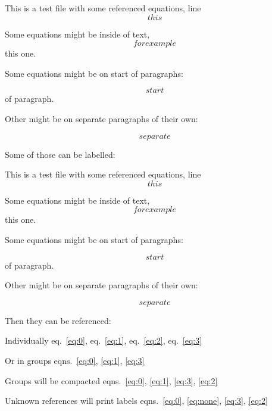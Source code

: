 This is a test file with some referenced equations, line \[ this \]

Some equations might be inside of text, \[ for example \] this one.

Some equations might be on start of paragraphs:

\[ start \] of paragraph.

Other might be on separate paragraphs of their own:

\[ separate \]

Some of those can be labelled:

This is a test file with some referenced equations, line
\begin{equation} this \label{eq:0}\end{equation}

Some equations might be inside of text,
\begin{equation} for example \label{eq:1}\end{equation} this one.

Some equations might be on start of paragraphs:

\begin{equation} start \label{eq:2}\end{equation} of paragraph.

Other might be on separate paragraphs of their own:

\begin{equation} separate \label{eq:3}\end{equation}

Then they can be referenced:

Individually eq.~\ref{eq:0}, eq.~\ref{eq:1}, eq.~\ref{eq:2},
eq.~\ref{eq:3}

Or in groups eqns.~\ref{eq:0}, \ref{eq:1}, \ref{eq:3}

Groups will be compacted
eqns.~\ref{eq:0}, \ref{eq:1}, \ref{eq:3}, \ref{eq:2}

Unknown references will print labels
eqns.~\ref{eq:0}, \ref{eq:none}, \ref{eq:3}, \ref{eq:2}
